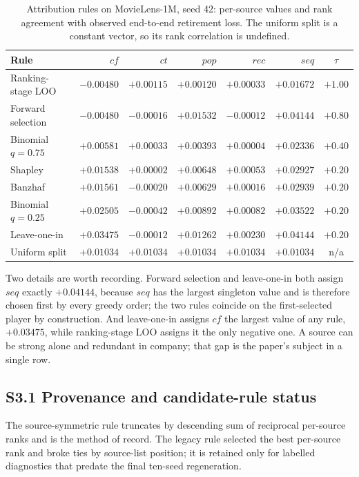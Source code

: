 \documentclass[10pt]{article}
\begin{document}
\begin{table}[H]
\centering
\caption{Attribution rules on MovieLens-1M, seed 42: per-source values and rank
agreement with observed end-to-end retirement loss. The uniform split is a
constant vector, so its rank correlation is undefined.}
\label{tab:rulecomparison-esm}
\small
\begin{tabular}{@{}lrrrrrc@{}}
\toprule
Rule & $cf$ & $ct$ & $pop$ & $rec$ & $seq$ & $\tau$ \\
\midrule
Ranking-stage LOO   & $-0.00480$ & $+0.00115$ & $+0.00120$ & $+0.00033$ & $+0.01672$ & $+1.00$ \\
Forward selection   & $-0.00480$ & $-0.00016$ & $+0.01532$ & $-0.00012$ & $+0.04144$ & $+0.80$ \\
Binomial $q{=}0.75$ & $+0.00581$ & $+0.00033$ & $+0.00393$ & $+0.00004$ & $+0.02336$ & $+0.40$ \\
Shapley             & $+0.01538$ & $+0.00002$ & $+0.00648$ & $+0.00053$ & $+0.02927$ & $+0.20$ \\
Banzhaf             & $+0.01561$ & $-0.00020$ & $+0.00629$ & $+0.00016$ & $+0.02939$ & $+0.20$ \\
Binomial $q{=}0.25$ & $+0.02505$ & $-0.00042$ & $+0.00892$ & $+0.00082$ & $+0.03522$ & $+0.20$ \\
Leave-one-in        & $+0.03475$ & $-0.00012$ & $+0.01262$ & $+0.00230$ & $+0.04144$ & $+0.20$ \\
Uniform split       & $+0.01034$ & $+0.01034$ & $+0.01034$ & $+0.01034$ & $+0.01034$ & n/a \\
\bottomrule
\end{tabular}
\end{table}

Two details are worth recording. Forward selection and leave-one-in both assign
$seq$ exactly $+0.04144$, because $seq$ has the largest singleton value and is
therefore chosen first by every greedy order; the two rules coincide on the
first-selected player by construction. And leave-one-in assigns $cf$ the
largest value of any rule, $+0.03475$, while ranking-stage LOO assigns it the
only negative one. A source can be strong alone and redundant in company; that
gap is the paper's subject in a single row.

\subsection*{S3.1 Provenance and candidate-rule status}

The source-symmetric rule truncates by descending sum of reciprocal per-source
ranks and is the method of record. The legacy rule selected the best
per-source rank and broke ties by source-list position; it is retained only for
labelled diagnostics that predate the final ten-seed regeneration.
\end{document}
